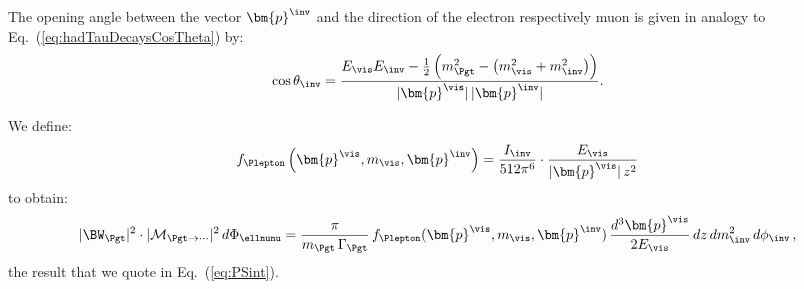 The opening angle between the vector $\bm{p}^{\inv}$ and the direction
of the electron respectively muon is given in analogy to Eq.~(\ref{eq:hadTauDecaysCosTheta}) by:
\begin{equation}
\cos\theta_{\inv} = \frac{E_{\vis} E_{\inv} - \frac{1}{2} \left(m^{2}_{\Pgt} - \left( m^{2}_{\vis} + m^{2}_{\inv} \right) \right)}{\vert\bm{p}^{\vis}\vert \, 
  \vert\bm{p}^{\inv}\vert}.
\label{eq:lepTauDecaysCosTheta}
\end{equation}

We define:
\begin{equation}
f_{\Plepton}\left(\bm{p}^{\vis}, m_{\vis}, \bm{p}^{\inv}\right) = 
\frac{I_{\inv}}{512\pi^{6}} \cdot \frac{E_{\vis}}{\vert\bm{p}^{\vis}\vert \, z^{2}}
\label{eq:lepTauDecays_f}
\end{equation}
to obtain:
\begin{equation}
\vert \BW_{\Pgt} \vert^{2} \cdot \vert\mathcal{M}_{\Pgt\to\cdots}\vert^{2} \,
 d\Phi_{\ellnunu} = \frac{\pi}{m_{\Pgt} \, \Gamma_{\Pgt}} \,
 f_{\Plepton}(\bm{p}^{\vis}, m_{\vis}, \bm{p}^{\inv}) \, \frac{d^{3}\bm{p}^{\vis}}{2 E_{\vis}} \, dz \, dm^{2}_{\inv} \, d\phi_{\inv}
 \, ,
\end{equation}
the result that we quote in Eq.~(\ref{eq:PSint}).
